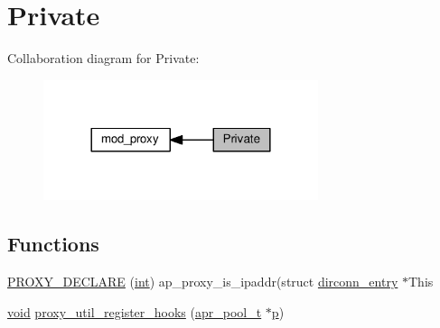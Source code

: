 \hypertarget{group__MOD__PROXY__PRIVATE}{}\section{Private}
\label{group__MOD__PROXY__PRIVATE}
Collaboration diagram for Private\+:
\nopagebreak
\begin{figure}[H]
\begin{center}
\leavevmode
\includegraphics[width=228pt]{group__MOD__PROXY__PRIVATE}
\end{center}
\end{figure}
\subsection*{Functions}
\begin{DoxyCompactItemize}
\item 
\hyperlink{group__MOD__PROXY__PRIVATE_ga9f6e6c19ac57d15d326c5d80171f7c4f}{P\+R\+O\+X\+Y\+\_\+\+D\+E\+C\+L\+A\+RE} (\hyperlink{pcre_8txt_a42dfa4ff673c82d8efe7144098fbc198}{int}) ap\+\_\+proxy\+\_\+is\+\_\+ipaddr(struct \hyperlink{structdirconn__entry}{dirconn\+\_\+entry} $\ast$This
\item 
\hyperlink{group__MOD__ISAPI_gacd6cdbf73df3d9eed42fa493d9b621a6}{void} \hyperlink{group__MOD__PROXY__PRIVATE_ga8c7cf405b2ffa890bad1419c0a6fd5ca}{proxy\+\_\+util\+\_\+register\+\_\+hooks} (\hyperlink{structapr__pool__t}{apr\+\_\+pool\+\_\+t} $\ast$\hyperlink{group__APACHE__CORE__MPM_ga5cd91701e5c167f2b1a38e70ab57817e}{p})
\end{DoxyCompactItemize}
